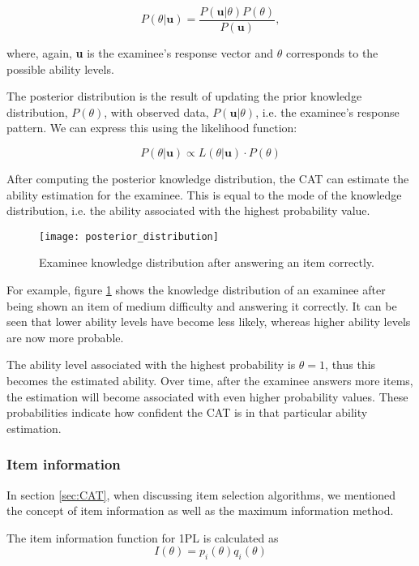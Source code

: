 $$P(\theta | \textbf{u}) = \dfrac{P(\textbf{u} | \theta)P(\theta)}{P(\textbf{u})} ,$$

where, again, \textbf{u} is the examinee's response vector and $\theta$ corresponds to the possible ability levels.\newline

The posterior distribution is the result of updating the prior knowledge distribution, $P(\theta)$, with observed data, $P(\textbf{u} | \theta)$, i.e. the examinee's response pattern. We can express this using the likelihood function:

$$P(\theta | \textbf{u}) \propto L(\theta | \textbf{u}) \cdot P(\theta)$$

After computing the posterior knowledge distribution, the CAT can estimate the ability estimation for the examinee. This is equal to the mode of the knowledge distribution, i.e. the ability associated with the highest probability value.

\begin{figure}[H]
\centering
\texttt{[image: posterior\_distribution]}
\caption{Examinee knowledge distribution after answering an item correctly.}
\label{fig:posterior_distribution}
\end{figure}

For example, figure \ref{fig:posterior_distribution} shows the knowledge distribution of an examinee after being shown an item of medium difficulty and answering it correctly. It can be seen that lower ability levels have become less likely, whereas higher ability levels are now more probable.\newline

The ability level associated with the highest probability is $\theta=1$, thus this becomes the estimated ability. Over time, after the examinee answers more items, the estimation will become associated with even higher probability values. These probabilities indicate how confident the CAT is in that particular ability estimation.


\subsubsection{Item information}
In section \ref{sec:CAT}, when discussing item selection algorithms, we mentioned the concept of item information as well as the maximum information method. \newline


The item information function for 1PL is calculated as
$$I(\theta) = p_i(\theta)q_i(\theta)$$

